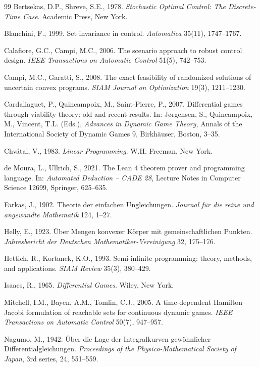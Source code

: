 \documentclass[11pt,a4paper]{article}
\theoremstyle{plain}
\theoremstyle{definition}
\theoremstyle{remark}
\begin{document}
\begin{thebibliography}{99}
 Bertsekas, D.P., Shreve, S.E., 1978. \emph{Stochastic Optimal Control: The Discrete-Time Case}. Academic Press, New York.

 Blanchini, F., 1999. Set invariance in control. \emph{Automatica} 35(11), 1747--1767.

 Calafiore, G.C., Campi, M.C., 2006. The scenario approach to robust control design. \emph{IEEE Transactions on Automatic Control} 51(5), 742--753.

 Campi, M.C., Garatti, S., 2008. The exact feasibility of randomized solutions of uncertain convex programs. \emph{SIAM Journal on Optimization} 19(3), 1211--1230.

 Cardaliaguet, P., Quincampoix, M., Saint-Pierre, P., 2007. Differential games through viability theory: old and recent results. In: J{\o}rgensen, S., Quincampoix, M., Vincent, T.L. (Eds.), \emph{Advances in Dynamic Game Theory}, Annals of the International Society of Dynamic Games 9, Birkh\"auser, Boston, 3--35.

 Chv\'atal, V., 1983. \emph{Linear Programming}. W.H. Freeman, New York.

 de Moura, L., Ullrich, S., 2021. The Lean 4 theorem prover and programming language. In: \emph{Automated Deduction -- CADE 28}, Lecture Notes in Computer Science 12699, Springer, 625--635.

 Farkas, J., 1902. Theorie der einfachen Ungleichungen. \emph{Journal f\"ur die reine und angewandte Mathematik} 124, 1--27.

 Helly, E., 1923. \"Uber Mengen konvexer K\"orper mit gemeinschaftlichen Punkten. \emph{Jahresbericht der Deutschen Mathematiker-Vereinigung} 32, 175--176.

 Hettich, R., Kortanek, K.O., 1993. Semi-infinite programming: theory, methods, and applications. \emph{SIAM Review} 35(3), 380--429.

 Isaacs, R., 1965. \emph{Differential Games}. Wiley, New York.

 Mitchell, I.M., Bayen, A.M., Tomlin, C.J., 2005. A time-dependent Hamilton--Jacobi formulation of reachable sets for continuous dynamic games. \emph{IEEE Transactions on Automatic Control} 50(7), 947--957.

 Nagumo, M., 1942. \"Uber die Lage der Integralkurven gew\"ohnlicher Differentialgleichungen. \emph{Proceedings of the Physico-Mathematical Society of Japan}, 3rd series, 24, 551--559.


\end{thebibliography}
\end{document}
